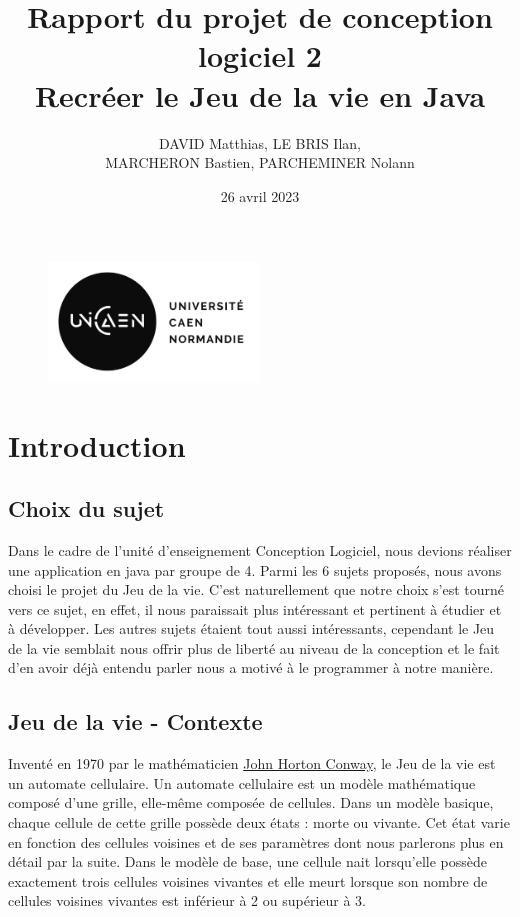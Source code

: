 \documentclass[12pt]{article}
\title{%
	Rapport du projet de conception logiciel 2 \\
	\large Recréer le Jeu de la vie en Java}
\author{DAVID Matthias, LE BRIS Ilan,\\ MARCHERON Bastien, PARCHEMINER Nolann}
\date{26 avril 2023}
\begin{document}
	\maketitle
	\begin{figure}[!h]
		\centering
		\includegraphics[width=0.5\textwidth]{images/logo_unicaen.png}
	\end{figure}
	\newpage
	
	\setcounter{tocdepth}{3}
	\tableofcontents
	\newpage
	
	\section{Introduction}
		\subsection{Choix du sujet}
			Dans le cadre de l’unité d’enseignement Conception Logiciel, nous devions réaliser une application en java par groupe de 4. Parmi les 6 sujets proposés, nous avons choisi le projet du Jeu de la vie. C’est naturellement que notre choix s’est tourné vers ce sujet, en effet, il nous paraissait plus intéressant et pertinent à étudier et à développer. Les autres sujets étaient tout aussi intéressants, cependant le Jeu de la vie semblait nous offrir plus de liberté au niveau de la conception et le fait d’en avoir déjà entendu parler nous a motivé à le programmer à notre manière. 
			
		\subsection{Jeu de la vie - Contexte}
			Inventé en 1970 par le mathématicien \href{https://fr.wikipedia.org/wiki/John_Horton_Conway}{John Horton Conway}, le Jeu de la vie est un automate cellulaire. Un automate cellulaire est un modèle mathématique composé d’une grille, elle-même composée de cellules. Dans un modèle basique, chaque cellule de cette grille possède deux états : morte ou vivante. Cet état varie en fonction des cellules voisines et de ses paramètres dont nous parlerons plus en détail par la suite. Dans le modèle de base, une cellule nait lorsqu'elle possède exactement trois cellules voisines vivantes et elle meurt lorsque son nombre de cellules voisines vivantes est inférieur à 2 ou supérieur à 3. 
			
\end{document}
